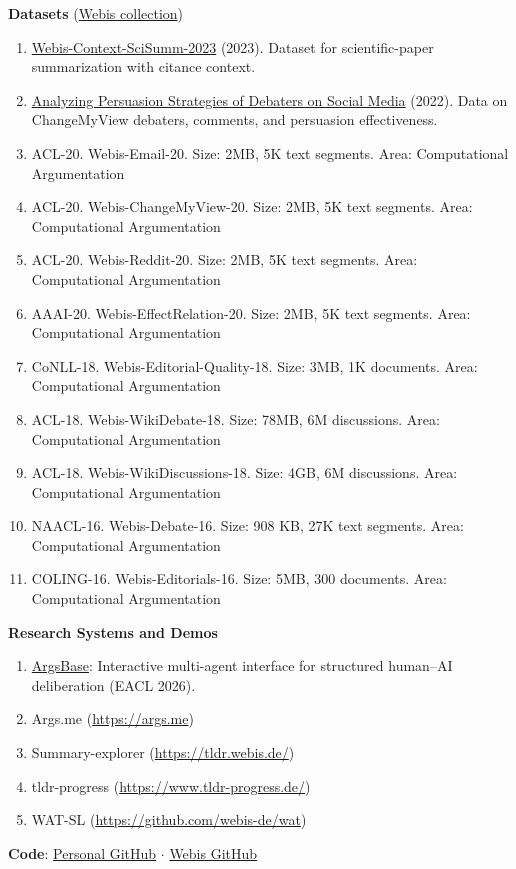 


\textbf{Datasets} (\href{https://webis.de/data.html?q=khalid\%2Bal-khatib}{Webis collection})

\begin{enumerate}
\item \href{https://doi.org/10.5281/zenodo.10031025}{Webis-Context-SciSumm-2023} (2023). Dataset for scientific-paper summarization with citance context.
\item \href{https://doi.org/10.5281/zenodo.7034173}{Analyzing Persuasion Strategies of Debaters on Social Media} (2022). Data on ChangeMyView debaters, comments, and persuasion effectiveness.
\item{ACL-20. Webis-Email-20. Size: 2MB, 5K text segments. Area: Computational Argumentation}
\item{ACL-20. Webis-ChangeMyView-20. Size: 2MB, 5K text segments. Area: Computational Argumentation}
\item{ACL-20. Webis-Reddit-20. Size: 2MB, 5K text segments. Area: Computational Argumentation}
\item{AAAI-20. Webis-EffectRelation-20. Size: 2MB, 5K text segments. Area: Computational Argumentation}
\item{CoNLL-18. Webis-Editorial-Quality-18. Size: 3MB, 1K documents. Area: Computational Argumentation}
\item{ACL-18. Webis-WikiDebate-18. Size: 78MB, 6M discussions. Area:	Computational Argumentation}
\item{ACL-18. Webis-WikiDiscussions-18. Size: 4GB, 6M discussions. Area: Computational Argumentation}
\item{NAACL-16. Webis-Debate-16. Size: 908 KB, 27K text segments. Area:	Computational Argumentation}
\item{COLING-16. Webis-Editorials-16. Size: 5MB, 300 documents. Area: Computational Argumentation}
\end{enumerate}

\textbf{Research Systems and Demos}
\begin{enumerate}
\item \href{https://argsbase.chat/}{ArgsBase}: Interactive multi-agent interface for structured human--AI deliberation (EACL 2026).
\item Args.me (\url{https://args.me})
\item Summary-explorer (\url{https://tldr.webis.de/})
\item tldr-progress (\url{https://www.tldr-progress.de/})
\item WAT-SL (\url{https://github.com/webis-de/wat})
\end{enumerate}

\textbf{Code}: \href{https://github.com/Khalid-AlKhatib}{Personal GitHub} $\cdot$ \href{https://github.com/webis-de}{Webis GitHub}
